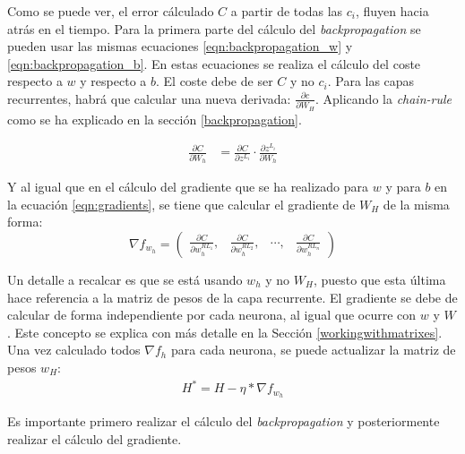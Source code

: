 Como se puede ver, el error cálculado $C$ a partir de todas las $c_i$, fluyen hacia atrás en el tiempo.
Para la primera parte del cálculo del \textit{backpropagation} se pueden usar las mismas ecuaciones \ref{eqn:backpropagation_w} y \ref{eqn:backpropagation_b}. En estas ecuaciones se realiza el cálculo del coste respecto a $w$ y respecto a $b$. El coste debe de ser $C$ y no $c_i$. Para las capas recurrentes, habrá que calcular una nueva derivada: $\frac{\partial c}{\partial W_H}$. Aplicando la \textit{chain-rule} como se ha explicado en la sección \ref{backpropagation}.

\begin{equation}
\begin{split}
     \frac{\partial C}{\partial W_h} &= \frac{\partial C}{\partial z^{L_i}} \cdot \frac{\partial z^{L_i}}{\partial W_h}
\end{split}
\label{eqn:backpropagation_h}
\end{equation}

Y al igual que en el cálculo del gradiente que se ha realizado para $w$ y para $b$ en la ecuación \ref{eqn:gradients}, se tiene que calcular el gradiente de $W_H$ de la misma forma:
\begin{equation}
    \nabla f_{w_h} = \begin{pmatrix} \frac{\partial C}{\partial w_h^{RL_1}}, & \frac{\partial C}{\partial w_h^{RL_2}}, & \cdots , &  \frac{\partial C}{\partial w_h^{RL_n}} \end{pmatrix}
\end{equation}

Un detalle a recalcar es que se está usando $w_h$ y no $W_H$, puesto que esta última hace referencia a la matriz de pesos de la capa recurrente. El gradiente se debe de calcular de forma independiente por cada neurona, al igual que ocurre con $w$ y $W$. Este concepto se explica con más detalle en la Sección \ref{workingwithmatrixes}. Una vez calculado todos $\nabla f_h$ para cada neurona, se puede actualizar la matriz de pesos $w_{H}$:
\begin{equation}
    \begin{split}
    H^* = H - \eta * \nabla f_{w_h}
    \end{split}
\end{equation}

Es importante primero realizar el cálculo del \textit{backpropagation} y posteriormente realizar el cálculo del gradiente.
\newline
